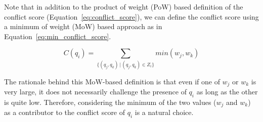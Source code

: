 \documentclass[10pt,a4paper]{article}
\newcommand{\addb}[1]{{\color{red} #1}}
\begin{document}







Note that in addition to the product of weight (PoW) based definition of the conflict score (Equation~\ref{eq:conflict_score}), we can define the conflict score using a minimum of weight (MoW) based approach as in Equation~\ref{eq:min_conflict_score}. %

\begin{equation}
\label{eq:min_conflict_score}
C(q_i) = \sum_{\{(q_j, q_k) \,|\, (q_j, q_k) \in Z_i\}} min(w_j , w_k)
\end{equation}

The rationale behind this MoW-based definition is that even if one of $w_j$ or $w_k$ is very large, it does not necessarily challenge the presence of $q_i$ as long as the other is quite low. Therefore, considering the minimum of the two values ($w_j$ and $w_k$) as a contributor to the conflict score of $q_i$ is a natural choice.
\end{document}
